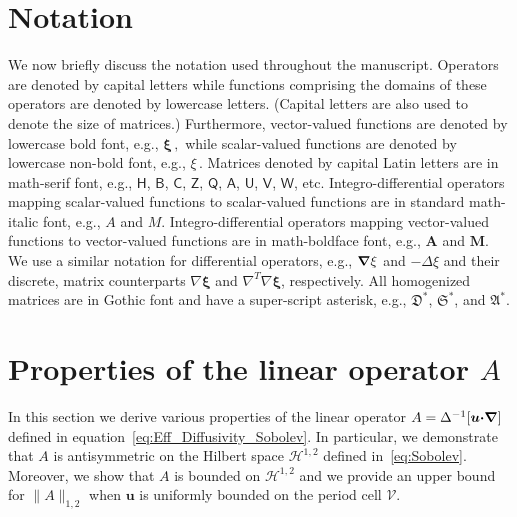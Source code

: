 \documentclass[english,12pt,jmp,graphicx]{revtex4-1}
\newcommand{\vecu}{\boldsymbol{u}}
\newcommand{\vecxi}{\boldsymbol{\xi}}
\newcommand{\bnabla}{\mbox{\boldmath${\nabla}$}}
\newcommand{\bcdot}{\mbox{\boldmath${\cdot}$}}
\newcommand{\Vc}{\mathcal{V}}
\newcommand{\Sg}{\mathfrak{S}}
\newcommand{\Ag}{\mathfrak{A}}
\newcommand{\Dg}{\mathfrak{D}}
\newcommand{\Hs}{\mathscr{H}}
\newcommand{\Hm}{\mathsf{H}}
\newcommand{\Um}{\mathsf{U}}
\newcommand{\Vm}{\mathsf{V}}
\newcommand{\Am}{\mathsf{A}}
\newcommand{\Bm}{\mathsf{B}}
\newcommand{\Cm}{\mathsf{C}}
\newcommand{\Zm}{\mathsf{Z}}
\newcommand{\Qm}{\mathsf{Q}}
\newcommand{\Wm}{\mathsf{W}}
\newcommand{\Mb}{\mathbf{M}}
\newcommand{\Ab}{\mathbf{A}}
\begin{document}
\section{Notation}\label{app:Notation}
%
We now briefly discuss the notation used throughout the
manuscript. Operators are denoted by capital letters while functions
comprising the domains of these operators are denoted by lowercase
letters. (Capital letters are also used to denote the size of
matrices.) Furthermore, vector-valued 
functions are denoted by lowercase bold font, e.g., $\vecxi\,,$ while
scalar-valued functions are denoted by lowercase non-bold font, e.g., 
$\xi\,.$ Matrices denoted by capital Latin letters are in math-serif
font, e.g., $\Hm$, $\Bm$, $\Cm$, $\Zm$, $\Qm$, $\Am$, $\Um$, $\Vm$,
$\Wm$, etc. Integro-differential operators mapping scalar-valued 
functions to scalar-valued functions are in standard math-italic font,
e.g., $A$ and $M$. Integro-differential  operators mapping
vector-valued functions to vector-valued functions are in
math-boldface font, e.g., $\Ab$ and $\Mb$. We use a similar notation
for differential operators, e.g., $\bnabla\xi$ and $-\Delta\xi$ and
their discrete, matrix counterparts $\nabla\vecxi$ and
$\nabla^T\nabla\vecxi$, respectively. All homogenized matrices are in
Gothic font and have a
super-script asterisk, e.g., $\Dg^*$, $\Sg^*$, and
$\Ag^*$. 


\section{Properties of the linear operator $A$}\label{app:Bounded_A}
%
In this section we derive various properties of the linear operator
$A=\Delta^{-1}[\vecu\bcdot\bnabla]$ defined
in equation~\eqref{eq:Eff_Diffusivity_Sobolev}. In particular, we
demonstrate that $A$ is antisymmetric on the Hilbert space $\Hs^{1,2}$
defined in~\eqref{eq:Sobolev}. Moreover, we show that $A$ is
bounded on $\Hs^{1,2}$ and we provide an upper bound for $\|A\|_{1,2}$ when
$\vecu$ is uniformly bounded on the period cell $\Vc$.  
\end{document}
